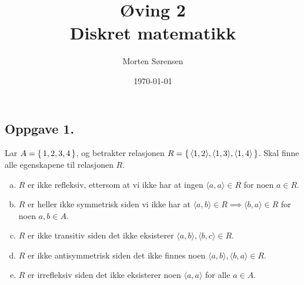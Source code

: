 \documentclass{article}
\title{\huge{Øving 2\\ Diskret matematikk}}
\author{Morten Sørensen}
\date{\today}
\begin{document}
\maketitle

\subsection*{Oppgave 1.}
Lar $A = \set{1, 2, 3, 4}$, og betrakter relasjonen $R = \set{\langle 1, 2 \rangle, \langle 1, 3 \rangle, \langle 1, 4 \rangle}$. 
Skal finne alle egenskapene til relasjonen $R$.

\begin{enumerate}[(a)]
	\item $R$ er ikke refleksiv, ettersom at vi ikke har at ingen $\langle a, a \rangle \in R$ for noen $a \in R$. 
	\item $R$ er heller ikke symmetrisk siden vi ikke har at $\langle a, b \rangle \in R \implies \langle b, a \rangle \in R$ for noen $a, b \in A$.
	\item $R$ er ikke transitiv siden det ikke eksisterer $\langle a, b \rangle, \langle b, c \rangle \in R$.
	\item $R$ er ikke antisymmetrisk siden det ikke finnes noen $\langle a, b \rangle, \langle b, a \rangle \in R$.
	\item $R$ er irrefleksiv siden det ikke eksisterer noen $\langle a, a \rangle$ for alle $a \in A$.
\end{enumerate}
\end{document}
